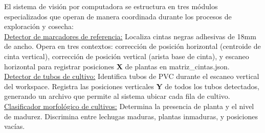 El sistema de visión por computadora se estructura en tres módulos especializados que operan de manera coordinada durante los procesos de exploración y cosecha:\\

\underline{Detector de marcadores de referencia:} Localiza cintas negras adhesivas de 18mm de ancho. Opera en tres contextos: corrección de posición horizontal (centroide de cinta vertical), corrección de posición vertical (arista base de cinta), y escaneo horizontal para registrar posiciones \textbf{X} de plantas en matriz\_cintas.json.\\

\underline{Detector de tubos de cultivo:} Identifica tubos de PVC durante el escaneo vertical del workspace. Registra las posiciones verticales \textbf{Y} de todos los tubos detectados, generando un archivo que permite al sistema ubicar cada fila de cultivo.\\

\underline{Clasificador morfológico de cultivos:} Determina la presencia de planta y el nivel de madurez. Discrimina entre lechugas maduras, plantas inmaduras, y posiciones vacías.
